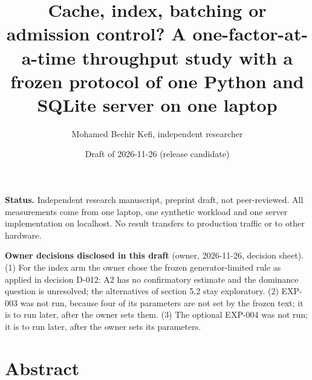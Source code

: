 \documentclass[
]{article}
\title{Cache, index, batching or admission control? A
one-factor-at-a-time throughput study with a frozen protocol of one
Python and SQLite server on one laptop}
\author{Mohamed Bechir Kefi, independent researcher}
\date{Draft of 2026-11-26 (release candidate)}
\begin{document}
\maketitle

\textbf{Status.} Independent research manuscript, preprint draft, not
peer-reviewed. All measurements come from one laptop, one synthetic
workload and one server implementation on localhost. No result transfers
to production traffic or to other hardware.

\textbf{Owner decisions disclosed in this draft} (owner, 2026-11-26,
decision sheet). (1) For the index arm the owner chose the frozen
generator-limited rule as applied in decision D-012: A2 has no
confirmatory estimate and the dominance question is unresolved; the
alternatives of section 5.2 stay exploratory. (2) EXP-003 was not run,
because four of its parameters are not set by the frozen text; it is to
run later, after the owner sets them. (3) The optional EXP-004 was not
run; it is to run later, after the owner sets its parameters.

\section{Abstract}\label{abstract}
\end{document}
